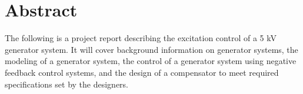 \section{Abstract}
The following is a project report describing the excitation control of a 5 kV generator system. It will cover background information on generator systems, the modeling of a generator system, the control of a generator system using negative feedback control systems, and the design of a compensator to meet required specifications set by the designers.


